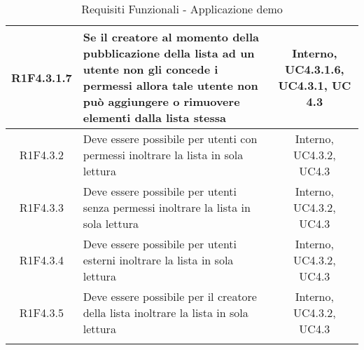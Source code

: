 \begin{longtable}{|c|>{\centering}m{7cm}|c|}
			\hline
			R1F4.3.1.7 & Se il creatore al momento della pubblicazione della lista ad un utente non gli concede i permessi allora tale utente non può aggiungere o rimuovere elementi dalla lista stessa & Interno, UC4.3.1.6, UC4.3.1, UC 4.3 \\
			\hline
			R1F4.3.2 & Deve essere possibile per utenti con permessi inoltrare la lista in sola lettura & Interno, UC4.3.2, UC4.3\\
			\hline
			R1F4.3.3 & Deve essere possibile per utenti senza permessi inoltrare la lista in sola lettura & Interno, UC4.3.2, UC4.3\\
			\hline
			R1F4.3.4 & Deve essere possibile per utenti esterni inoltrare la lista in sola lettura & Interno, UC4.3.2, UC4.3\\
			\hline
			R1F4.3.5 & Deve essere possibile per il creatore della lista inoltrare la lista in sola lettura & Interno, UC4.3.2, UC4.3\\
			\hline
\caption[Requisiti Funzionali - Applicazione demo]{Requisiti Funzionali - Applicazione demo}
\label{tabella: Requisiti Funzionali - Applicazione demo}
\end{longtable}
\endgroup
\clearpage
